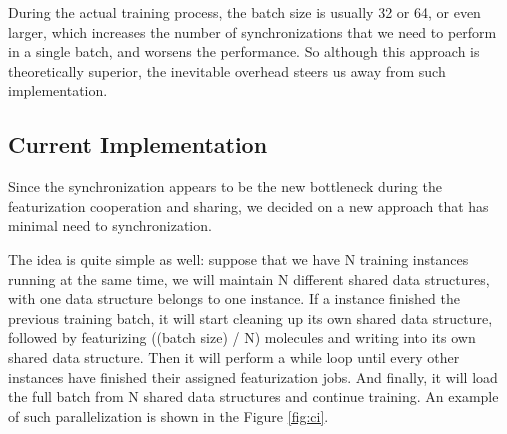 \documentclass[conference]{IEEEtran}
\begin{document}
During the actual training process, the batch size is usually 32 or 64, or even larger, which increases the number of synchronizations that we need to perform in a single batch, and worsens the performance. 
So although this approach is theoretically superior, the inevitable overhead steers us away from such implementation. 

\subsection{Current Implementation} \label{subsec_ci}

Since the synchronization appears to be the new bottleneck during the featurization cooperation and sharing, we decided on a new approach that has minimal need to synchronization. 

The idea is quite simple as well: suppose that we have N training instances running at the same time, we will maintain N different shared data structures, with one data structure belongs to one instance. 
If a instance finished the previous training batch, it will start cleaning up its own shared data structure, followed by featurizing ((batch size) / N) molecules and writing into its own shared data structure. 
Then it will perform a while loop until every other instances have finished their assigned featurization jobs. 
And finally, it will load the full batch from N shared data structures and continue training. 
An example of such parallelization is shown in the Figure \ref{fig:ci}. 
\end{document}
